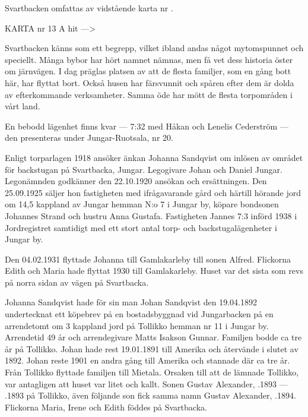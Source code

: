 
Svartbacken omfattas av vidstående karta nr .


KARTA nr 13 A hit --->





Svartbacken känns som ett begrepp, vilket ibland andas något mytomspunnet och speciellt. Många bybor har hört namnet nämnas, men få vet dess historia öster om järnvägen. I dag präglas platsen av att de flesta familjer, som en gång bott här, har flyttat bort. Också husen har färsvunnit och spåren efter dem är dolda av efterkommande verksamheter. Samma öde har mött de flesta torpområden i vårt land.

En bebodd lägenhet finns kvar ---  7:32 med Håkan och Lenelis Cederström --- den presenteras under Jungar-Ruotsala, nr 20.





Enligt torparlagen 1918 ansöker änkan Johanna Sandqvist om inlösen av området för backstugan på Svartbacka, Jungar. Legogivare 	Johan och Daniel Jungar. Legonämnden godkänner den 22.10.1920 ansökan och ersättningen. Den 25.09.1925 säljer hon fastigheten med ifrågavarande gård och härtill hörande jord om 14,5 kappland av Jungar hemman N:o 7 i Jungar by, köpare  bondsonen Johannes Strand och hustru Anna Gustafa. Fastigheten Jannes 7:3 införd 1938 i Jordregistret samtidigt med ett stort antal torp- och backstugalägenheter i Jungar by.

Den 04.02.1931 flyttade Johanna till Gamlakarleby till sonen Alfred. Flickorna Edith och Maria hade flyttat 1930 till Gamlakarleby. Huset var det sista som revs på norra sidan av vägen på Svartbacka.

Johanna Sandqvist hade för sin man Johan Sandqvist den 19.04.1892	undertecknat ett köpebrev på en bostadsbyggnad vid Jungarbacken på en arrendetomt om 3 kappland jord på Tollikko	hemman nr 11 i Jungar by. Arrendetid 49 år och arrendegivare Matts	Isakson Gunnar. Familjen bodde ca tre år på Tollikko. Johan hade rest	19.01.1891 till Amerika och återvände i slutet av 1892. Johan reste 1901 en andra gång till Amerika och stannade där ca tre år. Från Tollikko flyttade familjen till Mietala. Orsaken till att de lämnade Tollikko, var antagligen att huset var litet och kallt. Sonen Gustav Alexander, .1893  ---  .1893 på Tollikko, även följande son fick samma namn Gustav Alexander, .1894. Flickorna Maria, Irene och 	Edith föddes på Svartbacka.

